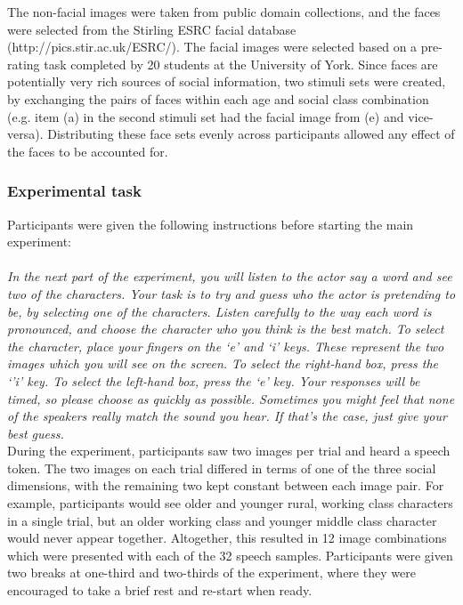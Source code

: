 \documentclass[PWPL]{article}
\begin{document}
The non-facial images were taken from public domain collections, and the faces were selected from the Stirling ESRC facial database (http://pics.stir.ac.uk/ESRC/). The facial images were selected based on a pre-rating task completed by 20 students at the University of York. Since faces are potentially very rich sources of social information, two stimuli sets were created, by exchanging the pairs of faces within each age and social class combination (e.g. item (a) in the second stimuli set had the facial image from (e) and vice-versa). Distributing these face sets evenly across participants allowed any effect of the faces to be accounted for.

\subsubsection{Experimental task}

Participants were given the following instructions before starting the main experiment:\\\\
\textit{In the next part of the experiment, you will listen to the actor say a word and see two of the characters. Your task is to try and guess who the actor is pretending to be, by selecting one of the characters. Listen carefully to the way each word is pronounced, and choose the character who you think is the best match. To select the character, place your fingers on the `e' and `i' keys. These represent the two images which you will see on the screen. To select the right-hand box, press the `'i' key. To select the left-hand box, press the `e' key. Your responses will be timed, so please choose as quickly as possible. Sometimes you might feel that none of the speakers really match the sound you hear. If that's the case, just give your best guess.}\\

During the experiment, participants saw two images per trial and heard a speech token. The two images on each trial differed in terms of one of the three social dimensions, with the remaining two kept constant between each image pair. For example, participants would see older and younger rural, working class characters in a single trial, but an older working class and younger middle class character would never appear together. Altogether, this resulted in 12 image combinations which were presented with each of the 32 speech samples. Participants were given two breaks at one-third and two-thirds of the experiment, where they were encouraged to take a brief rest and re-start when ready.
\end{document}
